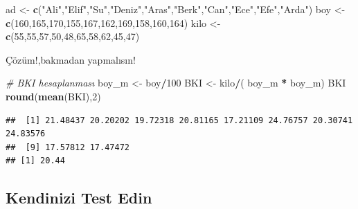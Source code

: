 \documentclass[
  oneside]{book}
\newenvironment{Shaded}{\begin{snugshade}}{\end{snugshade}}
\newcommand{\CommentTok}[1]{\textcolor[rgb]{0.56,0.35,0.01}{\textit{#1}}}
\newcommand{\DecValTok}[1]{\textcolor[rgb]{0.00,0.00,0.81}{#1}}
\newcommand{\FunctionTok}[1]{\textcolor[rgb]{0.13,0.29,0.53}{\textbf{#1}}}
\newcommand{\NormalTok}[1]{#1}
\newcommand{\OtherTok}[1]{\textcolor[rgb]{0.56,0.35,0.01}{#1}}
\newcommand{\SpecialCharTok}[1]{\textcolor[rgb]{0.81,0.36,0.00}{\textbf{#1}}}
\newcommand{\StringTok}[1]{\textcolor[rgb]{0.31,0.60,0.02}{#1}}
\begin{document}
\begin{Shaded}
\begin{Highlighting}[]
\NormalTok{ad  }\OtherTok{\textless{}{-}}  \FunctionTok{c}\NormalTok{(}\StringTok{"Ali"}\NormalTok{,}\StringTok{"Elif"}\NormalTok{,}\StringTok{"Su"}\NormalTok{,}\StringTok{"Deniz"}\NormalTok{,}\StringTok{"Aras"}\NormalTok{,}\StringTok{"Berk"}\NormalTok{,}\StringTok{"Can"}\NormalTok{,}\StringTok{"Ece"}\NormalTok{,}\StringTok{"Efe"}\NormalTok{,}\StringTok{"Arda"}\NormalTok{)}
\NormalTok{boy }\OtherTok{\textless{}{-}} \FunctionTok{c}\NormalTok{(}\DecValTok{160}\NormalTok{,}\DecValTok{165}\NormalTok{,}\DecValTok{170}\NormalTok{,}\DecValTok{155}\NormalTok{,}\DecValTok{167}\NormalTok{,}\DecValTok{162}\NormalTok{,}\DecValTok{169}\NormalTok{,}\DecValTok{158}\NormalTok{,}\DecValTok{160}\NormalTok{,}\DecValTok{164}\NormalTok{)}
\NormalTok{kilo }\OtherTok{\textless{}{-}} \FunctionTok{c}\NormalTok{(}\DecValTok{55}\NormalTok{,}\DecValTok{55}\NormalTok{,}\DecValTok{57}\NormalTok{,}\DecValTok{50}\NormalTok{,}\DecValTok{48}\NormalTok{,}\DecValTok{65}\NormalTok{,}\DecValTok{58}\NormalTok{,}\DecValTok{62}\NormalTok{,}\DecValTok{45}\NormalTok{,}\DecValTok{47}\NormalTok{)}
\end{Highlighting}
\end{Shaded}

Çözüm!,bakmadan yapmalısın!

\begin{Shaded}
\begin{Highlighting}[]
\CommentTok{\# BKI  hesaplanması}
\NormalTok{boy\_m  }\OtherTok{\textless{}{-}}\NormalTok{ boy}\SpecialCharTok{/}\DecValTok{100}
\NormalTok{BKI }\OtherTok{\textless{}{-}}\NormalTok{ kilo}\SpecialCharTok{/}\NormalTok{( boy\_m }\SpecialCharTok{*}\NormalTok{ boy\_m)}
\NormalTok{BKI}
\FunctionTok{round}\NormalTok{(}\FunctionTok{mean}\NormalTok{(BKI),}\DecValTok{2}\NormalTok{)}
\end{Highlighting}
\end{Shaded}

\begin{verbatim}
##  [1] 21.48437 20.20202 19.72318 20.81165 17.21109 24.76757 20.30741 24.83576
##  [9] 17.57812 17.47472
## [1] 20.44
\end{verbatim}

\hypertarget{kendinizi-test-edin}{%
\subsection{Kendinizi Test Edin}\label{kendinizi-test-edin}}
\end{document}
